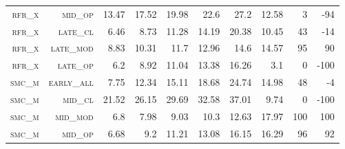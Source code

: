 \begin{landscape}
\begin{table}[!htbp]
\begin{tabular}{@{}rrrrrrr|rrr@{}}
\footnotesize \textsc{rfr\_x}      & \footnotesize \textsc{mid\_op   }        & \footnotesize  13.47       & \footnotesize 17.52   & \footnotesize 19.98     & \footnotesize 22.6             & \footnotesize 27.2      & \footnotesize 12.58    & \footnotesize 3     & \footnotesize -94      \\
\footnotesize \textsc{rfr\_x}      & \footnotesize \textsc{late\_cl  }        & \footnotesize  6.46        & \footnotesize 8.73    & \footnotesize 11.28     & \footnotesize 14.19            & \footnotesize 20.38     & \footnotesize 10.45    & \footnotesize 43    & \footnotesize -14      \\
\footnotesize \textsc{rfr\_x}      & \footnotesize \textsc{late\_mod }        & \footnotesize  8.83        & \footnotesize 10.31   & \footnotesize 11.7      & \footnotesize 12.96            & \footnotesize 14.6      & \footnotesize 14.57    & \footnotesize 95    & \footnotesize 90      \\
\footnotesize \textsc{rfr\_x}      & \footnotesize \textsc{late\_op  }        & \footnotesize  6.2         & \footnotesize 8.92    & \footnotesize 11.04     & \footnotesize 13.38            & \footnotesize 16.26     & \footnotesize 3.1      & \footnotesize 0     & \footnotesize -100     \\
\footnotesize \textsc{smc\_m}      & \footnotesize \textsc{early\_all}        & \footnotesize  7.75        & \footnotesize 12.34   & \footnotesize 15.11     & \footnotesize 18.68            & \footnotesize 24.74     & \footnotesize 14.98    & \footnotesize 48    & \footnotesize -4      \\
\footnotesize \textsc{smc\_m}      & \footnotesize \textsc{mid\_cl   }        & \footnotesize  21.52       & \footnotesize 26.15   & \footnotesize 29.69     & \footnotesize 32.58            & \footnotesize 37.01     & \footnotesize 9.74     & \footnotesize 0     & \footnotesize -100     \\
\footnotesize \textsc{smc\_m}      & \footnotesize \textsc{mid\_mod  }        & \footnotesize  6.8         & \footnotesize 7.98    & \footnotesize 9.03      & \footnotesize 10.3             & \footnotesize 12.63     & \footnotesize 17.97    & \footnotesize 100   & \footnotesize 100     \\
\footnotesize \textsc{smc\_m}      & \footnotesize \textsc{mid\_op   }        & \footnotesize  6.68        & \footnotesize 9.2     & \footnotesize 11.21     & \footnotesize 13.08            & \footnotesize 16.15     & \footnotesize 16.29    & \footnotesize 96    & \footnotesize 92     \\

\end{tabular}
\end{table}
\end{landscape}
